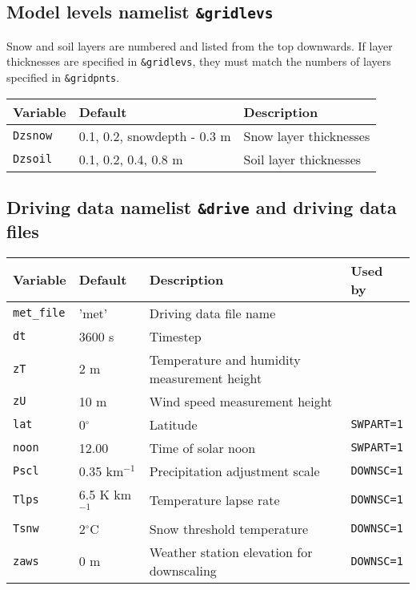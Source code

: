 \documentclass{article}
\begin{document}
\subsection{Model levels namelist {\tt \&gridlevs}}
Snow and soil layers are numbered and listed from the top downwards. If layer thicknesses are specified in {\tt \&gridlevs}, they must match the numbers of layers specified in {\tt \&gridpnts}.

\begin{longtable}{|l|l|l|}
\hline
Variable     & Default                     & Description           \\
\hline
{\tt Dzsnow} & 0.1, 0.2, snowdepth - 0.3 m & Snow layer thicknesses \\
{\tt Dzsoil} & 0.1, 0.2, 0.4, 0.8 m        & Soil layer thicknesses \\
\hline
\end{longtable}

\subsection{Driving data namelist {\tt \&drive} and driving data files}

\begin{longtable}{|l|l|l|l|}
\hline
Variable        & Default & Description                               & Used by       \\
\hline
{\tt met\_file} & 'met'   & Driving data file name                    &               \\
{\tt dt}        & 3600 s  & Timestep                                  &               \\
{\tt zT}        & 2 m     & Temperature and humidity measurement height &             \\
{\tt zU}        & 10 m    & Wind speed measurement height             &               \\
{\tt lat}       &0$^\circ$& Latitude                                  &{\tt SWPART=1} \\
{\tt noon}      & 12.00   & Time of solar noon                        &{\tt SWPART=1} \\
{\tt Pscl}      & 0.35 km$^{-1}$  & Precipitation adjustment scale    &{\tt DOWNSC=1} \\
{\tt Tlps}      & 6.5 K km$^{-1}$ & Temperature lapse rate            &{\tt DOWNSC=1} \\
{\tt Tsnw}      & 2$^\circ$C      & Snow threshold temperature        &{\tt DOWNSC=1} \\
{\tt zaws}      & 0 m     & Weather station elevation for downscaling &{\tt DOWNSC=1} \\
\hline 
\end{longtable}
\end{document}
